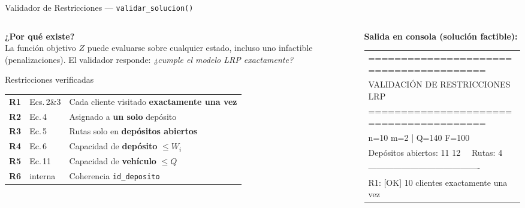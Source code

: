 \documentclass[aspectratio=169,10pt]{beamer}
\newcommand{\tc}[1]{\texttt{\small #1}}
\begin{document}
\begin{frame}{Validador de Restricciones --- \tc{validar\_solucion()}}
  \begin{columns}[T,onlytextwidth]
    \begin{column}{0.46\textwidth}
      \textbf{¿Por qué existe?}\\[0.3em]
      \small La función objetivo $Z$ puede evaluarse sobre cualquier
      estado, incluso uno infactible (penalizaciones).
      El validador responde: \textit{¿cumple el modelo LRP exactamente?}

      \vspace{0.5em}
      \begin{block}{Restricciones verificadas}\footnotesize
        \begin{tabular}{@{}clp{3.1cm}@{}}
          \textbf{R1} & Ecs.\,2\&3 & Cada cliente visitado \textbf{exactamente una vez} \\
          \textbf{R2} & Ec.\,4     & Asignado a \textbf{un solo} depósito \\
          \textbf{R3} & Ec.\,5     & Rutas solo en \textbf{depósitos abiertos} \\
          \textbf{R4} & Ec.\,6     & Capacidad de \textbf{depósito} $\leq W_i$ \\
          \textbf{R5} & Ec.\,11    & Capacidad de \textbf{vehículo} $\leq Q$ \\
          \textbf{R6} & interna    & Coherencia \texttt{id\_deposito} \\
        \end{tabular}
      \end{block}
    \end{column}
    \begin{column}{0.52\textwidth}
      \textbf{Salida en consola (solución factible):}
      \vspace{0.2em}
      {\tiny\ttfamily
      \begin{tabular}{@{}l@{}}
      ========================================\\
      \phantom{xx}VALIDACIÓN DE RESTRICCIONES LRP\\
      ========================================\\
      n=10  m=2  |  Q=140  F=100\\
      Depósitos abiertos: 11 12 \ \ Rutas: 4\\
      ----------------------------------------\\
      R1: [OK]  10 clientes exactamente una vez\\

\end{tabular}}
\end{column}
\end{columns}
\end{frame}
\end{document}
